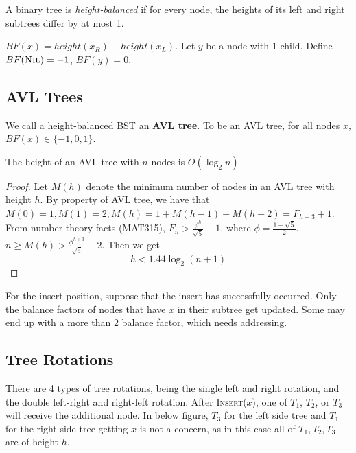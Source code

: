 \begin{definition}
A binary tree is \textit{height-balanced} if for every node, the heights of its left and right subtrees differ by at most 1.
\end{definition}

\begin{definition}
    $BF(x) = height(x_R) - height(x_L)$. Let $y$ be a node with 1 child. Define $BF(\textsc{Nil}) = -1$, $BF(y) = 0$.
\end{definition}

\subsection{AVL Trees}

We call a height-balanced BST an \textbf{AVL tree}. To be an AVL tree, for all nodes $x$, $BF(x) \in \{ -1, 0, 1 \}$.

\begin{simplethm}
    The height of an AVL tree with $n$ nodes is $O(\log_2 n)$ .
\end{simplethm}
\begin{proof}
    Let $M(h)$ denote the minimum number of nodes in an AVL tree with height $h$. By property of AVL tree, we have that $M(0) = 1, M(1) = 2, M(h) = 1 + M(h - 1) + M(h - 2) = F_{h + 3} + 1$. From number theory facts (MAT315), $F_n > \frac{\phi^h}{\sqrt{5}} - 1$, where $\phi = \frac{1 + \sqrt{5}}{2}$. $n \geq M(h) > \frac{\phi^{h+3}}{\sqrt{5}} - 2$. Then we get
    \[
    h < 1.44 \log_2 (n + 1) 
    \]
\end{proof}

For the insert position, suppose that the insert has successfully occurred. Only the balance factors of nodes that have $x$ in their subtree get updated. Some may end up with a more than 2 balance factor, which needs addressing.

\subsection{Tree Rotations}

There are 4 types of tree rotations, being the single left and right rotation, and the double left-right and right-left rotation. After \textsc{Insert}($x$), one of $T_1$, $T_2$, or $T_3$ will receive the additional node. In below figure, $T_3$ for the left side tree and $T_1$ for the right side tree getting $x$ is not a concern, as in this case all of $T_1, T_2, T_3$ are of height $h$. 


